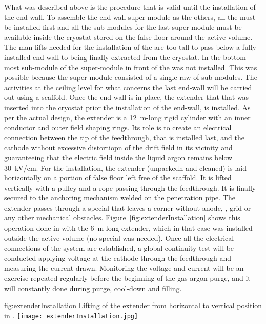 What was described above is the procedure that is valid until the installation of the  end-wall.
To assemble the end-wall super-module as the others, all the  must be installed first and all the sub-modules for the last super-module must be available inside the cryostat stored on the false floor around the active volume.
The man lifts needed for the installation of the  are too tall to pass below a fully installed end-wall to being finally extracted from the cryostat.
In  the bottom-most sub-module of the super-module in front of the  was not installed.
This was possible because the super-module consisted of a single raw of sub-modules.
The activities at the ceiling level for what concerns the last end-wall will be carried out using a scaffold.
Once the end-wall is in place, the  extender that that was inserted into the cryostat prior the installation of the end-wall,
is installed.
As per the actual design, the extender is a 12~m-long rigid cylinder with an inner conductor and outer field shaping rings.
Its role is to create an electrical connection between the tip of the feedthrough, that is installed last, and the cathode without excessive distortiopn of the drift field in its vicinity and guaranteeing that the electric field inside the liquid argon remains below 30~kV/cm.
For the installation, the extender (unpackedn and cleaned) is laid horizontally on a portion of false floor left free of the scaffold.
It is lifted vertically with a pulley and a rope passing through the  feedthrough.
It is finally secured to the anchoring mechanism welded on the penetration pipe.
The extender passes through a special  that leaves a corner without anode, , grid or any other mechanical obstacles.
Figure~\ref{fig:extenderInstallation} shows this operation done in  with the 6~m-long extender, which in that case was installed outside the active volume (no special  was needed).
Once all the electrical connections of the  system are established, a global continuity test will be conducted applying voltage at the cathode through the  feedthrough and measuring the current drawn.
Monitoring the voltage and current will be an exercise repeated regularly before the beginning of the gas argon purge, and it will constantly done during purge, cool-down and filling. 
\begin{dunefigure}{fig:extenderInstallation}
{Lifting of the  extender from horizontal to vertical position in  .}
\texttt{[image: extenderInstallation.jpg]}
\end{dunefigure}



